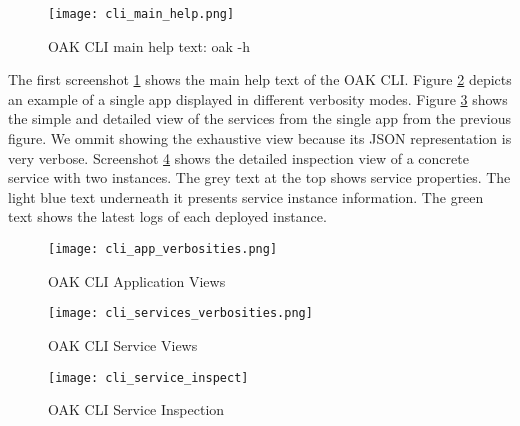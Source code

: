 \begin{figure}[h]
    \begin{adjustwidth}{-0.1\paperwidth}{-0.1\paperwidth}
        \centering
        \texttt{[image: cli\_main\_help.png]}
        \caption{OAK CLI main help text: oak -h}
        \label{fig:cli_main_help}
    \end{adjustwidth}
\end{figure}
The first screenshot \ref{fig:cli_main_help} shows the main help text of the OAK CLI.
Figure \ref{fig:cli_app_views} depicts an example of a single app displayed in different verbosity modes.
Figure \ref{fig:cli_service_views} shows the simple and detailed view of the services from the single app from the previous figure.
We ommit showing the exhaustive view because its JSON representation is very verbose.
Screenshot \ref{fig:cli_service_inspection} shows the detailed inspection view of a concrete service with two instances.
The grey text at the top shows service properties.
The light blue text underneath it presents service instance information.
The green text shows the latest logs of each deployed instance.

\begin{figure}[h]
    \begin{adjustwidth}{-0.2\paperwidth}{-0.2\paperwidth}
        \centering
        \texttt{[image: cli\_app\_verbosities.png]}
        \caption{OAK CLI Application Views}
        \label{fig:cli_app_views}
    \end{adjustwidth}
\end{figure}

\begin{figure}[p]
    \centering
    \texttt{[image: cli\_services\_verbosities.png]}
    \caption{OAK CLI Service Views}
    \label{fig:cli_service_views}
\end{figure}

\begin{figure}[p]
    \begin{adjustwidth}{-0.1\paperwidth}{-0.1\paperwidth}
        \centering
        \texttt{[image: cli\_service\_inspect]}
        \caption{OAK CLI Service Inspection}
        \label{fig:cli_service_inspection}
    \end{adjustwidth}
\end{figure}
